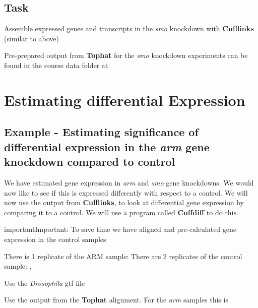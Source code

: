 \documentclass[a4paper,11pt,english]{sphinxmanual}
\begin{document}
\section{Task}
\label{exercises/STEP4_CUFFLINKS_DE:task}
Assemble expressed genes and transcripts in the \emph{smo} knockdown with \textbf{Cufflinks} (similar to above)

Pre-prepared output from \textbf{Tophat} for the \emph{smo} knockdown experiments can be found in the course data folder at 


\chapter{Estimating differential Expression}
\label{exercises/STEP4_CUFFLINKS_DE:estimating-differential-expression}

\section{Example - Estimating significance of differential expression in the \emph{arm} gene knockdown compared to control}
\label{exercises/STEP4_CUFFLINKS_DE:example-estimating-significance-of-differential-expression-in-the-arm-gene-knockdown-compared-to-control}
We have estimated gene expression in \emph{arm} and \emph{smo} gene knockdowns. We would now like to see if this is expressed differently with respect to a control. We will now use the output from \textbf{Cufflinks}, to look at differential gene expression by comparing it to a control. We will use a program called \textbf{Cuffdiff} to do this.

\begin{notice}{important}{Important:}
To save time we have aligned and pre-calculated gene expression in the control samples
\end{notice}

There is 1 replicate of the ARM sample: 
There are 2 replicates of the control sample: , 

Use the \emph{Drosophila} gtf file 

Use the  output from the \textbf{Tophat} alignment. For the \emph{arm} samples this is 
\end{document}
